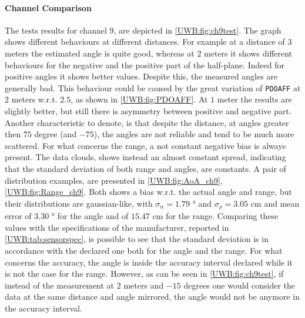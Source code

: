 \paragraph{Channel Comparison}
The tests results for channel 9, are depicted in \autoref{UWB:fig:ch9test}. The graph shows different behaviours at different distances. For example at a distance of $3$ meters the estimated angle is quite good, whereas at $2$ meters it shows different behaviours for the negative and the positive part of the half-plane. Indeed for positive angles it shows better values. Despite this, the measured angles are generally bad. This behaviour could be caused by the great variation of \texttt{PDOAFF} at $2$ meters w.r.t. $2.5$, as shown in \autoref{UWB:fig:PDOAFF}. At $1$ meter the results are slightly better, but still there is asymmetry between positive and negative part. Another characteristic  to denote, is that despite the distance, at angles greater then $75$ degree (and $-75$), the angles are not reliable and tend to be much more scattered. For what concerns the range, a not constant negative bias is always present. The data clouds, shows instead an almost constant spread, indicating that the standard deviation of both range and angles, are constants. A pair of distribution examples, are presented in \autoref{UWB:fig:AoA_ch9}, \ref{UWB:fig:Range_ch9}. Both shows a bias w.r.t. the actual angle and range, but their distributions are gaussian-like, with $\sigma_{\alpha} = 1.79$ ° and $\sigma_{\rho} = 3.05$ cm and mean error of $3.30$ ° for the angle and of $15.47$ cm for the range. Comparing these values with the specifications of the manufacturer, reported in \autoref{UWB:tab:sensorspec}, is possible to see that the standard deviation is in accordance with the declared one both for the angle and the range. For what concerns the accuracy, the angle is inside the accuracy interval declared while it is not the case for the range. However, as can be seen in \autoref{UWB:fig:ch9test}, if instead of the measurement at $2$ meters and $-15$ degrees one would consider the data at the same distance and angle mirrored, the angle would not be anymore in the accuracy interval.\\

